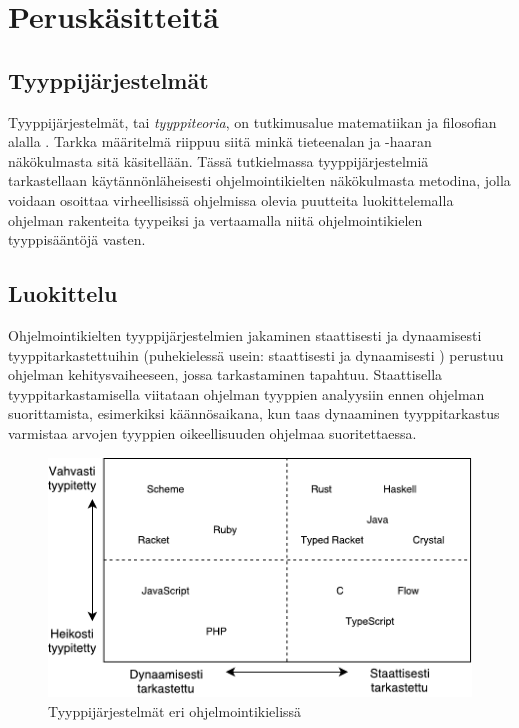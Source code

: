 \chapter{Peruskäsitteitä}
\section{Tyyppijärjestelmät}
Tyyppijärjestelmät, tai \textit{tyyppiteoria}, on tutkimusalue matematiikan
ja filosofian alalla \cite{TypesAndProgrammingLanguages}. Tarkka
 määritelmä riippuu siitä minkä
tieteenalan ja -haaran näkökulmasta sitä käsitellään. Tässä tutkielmassa
tyyppijärjestelmiä tarkastellaan käytännönläheisesti
ohjelmointikielten näkökulmasta metodina, jolla voidaan osoittaa
virheellisissä ohjelmissa olevia puutteita luokittelemalla
ohjelman rakenteita tyypeiksi ja vertaamalla niitä ohjelmointikielen
tyyppisääntöjä vasten. 

\section{Luokittelu}
Ohjelmointikielten tyyppijärjestelmien jakaminen staattisesti ja dynaamisesti
tyyppitarkastettuihin (puhekielessä usein: staattisesti ja dynaamisesti
) perustuu ohjelman kehitysvaiheeseen, jossa tarkastaminen
tapahtuu. Staattisella tyyppitarkastamisella viitataan ohjelman tyyppien
analyysiin ennen ohjelman suorittamista, esimerkiksi käännösaikana, kun taas
dynaaminen tyyppitarkastus varmistaa arvojen tyyppien oikeellisuuden ohjelmaa
suoritettaessa.

\begin{figure}
\centering
\includegraphics{images/type-systems.pdf}
\caption{Tyyppijärjestelmät eri ohjelmointikielissä}
\end{figure}

